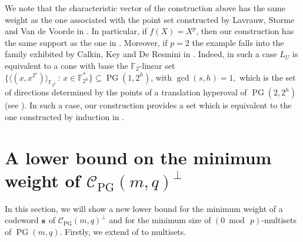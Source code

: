 \documentclass[12pt]{article}
\newcommand{\cC}{{\mathcal C}}
\newcommand{\F}{{\mathbb F}}
\DeclareMathOperator{\PG}{{PG}}
\begin{document}
	We note that the characteristic vector of the construction above has the same weight as the one associated with the point set constructed by Lavrauw, Storme and Van de Voorde in \cite[Theorem 4.14] {linearcodes}.  In particular, if $f(X)=X^p$, then our construction has the same support as the one in \cite[Theorem 4.14] {linearcodes}. Moreover, if $p=2$ the example falls into the family exhibited by Calkin, Key and De Resmini in \cite{DeResmini}. Indeed, in such a case $L_U$ is equivalent to a cone with base the $\F_2$-linear set $\{\langle (x,x^{2^s})\rangle_{\F_{2^h}}\,:\, x \in \F_{2^h}^*\} \subseteq \PG(1,2^h)$, with $\gcd(s,h)=1,$ which is the set of directions determined by the points of a translation hyperoval of $\PG(2,2^h)$ (see \cite{payne_complete_1971}). In such a case, our construction provides a set which is equivalent to the one constructed by induction in \cite[Note $1$]{DeResmini}.
	
	
	\section{\texorpdfstring{A lower bound on the minimum weight of $\cC_{\PG}(m,q)^{\perp}$}{A lower bound on the minimum weight of CPG(m,q)perp}} \label{sec:lowerbound} 
	
	In this section,  we will show a new lower bound for the minimum weight of a codeword ${\bf s }$ of $\cC_{\PG}(m,q)^{\perp}$ and for the minimum size of $(0 \bmod \,p)$-multisets of $\PG(m,q)$. 
	Firstly, we extend of \cite[Proposition 1]{DeResmini} to multisets.
	
\end{document}
